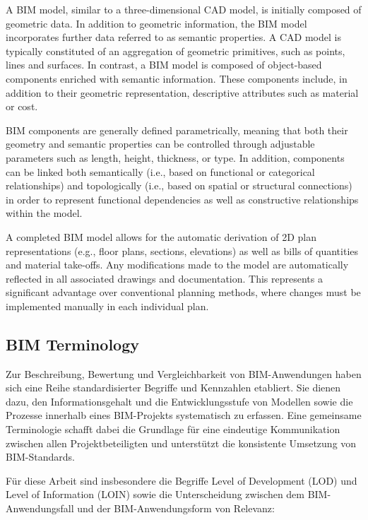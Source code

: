 \begin{English}
    A BIM model, similar to a three-dimensional CAD model, is initially composed of geometric data. In addition to geometric information, the BIM model incorporates further data referred to as semantic properties. A CAD model is typically constituted of an aggregation of geometric primitives, such as points, lines and surfaces. In contrast, a BIM model is composed of object-based components enriched with semantic information. These components include, in addition to their geometric representation, descriptive attributes such as material or cost.

    BIM components are generally defined parametrically, meaning that both their geometry and semantic properties can be controlled through adjustable parameters such as length, height, thickness, or type. In addition, components can be linked both semantically (i.e., based on functional or categorical relationships) and topologically (i.e., based on spatial or structural connections) in order to represent functional dependencies as well as constructive relationships within the model.

    A completed BIM model allows for the automatic derivation of 2D plan representations (e.g., floor plans, sections, elevations) as well as bills of quantities and material take-offs. Any modifications made to the model are automatically reflected in all associated drawings and documentation. This represents a significant advantage over conventional planning methods, where changes must be implemented manually in each individual plan. \cite{astourLehrbuchGrundlagenBIMArbeitsmethode2022}
\end{English}

\subsection{BIM Terminology}
\begin{German}
    Zur Beschreibung, Bewertung und Vergleichbarkeit von BIM-Anwendungen haben sich eine Reihe standardisierter Begriffe und Kennzahlen etabliert. Sie dienen dazu, den Informationsgehalt und die Entwicklungsstufe von Modellen sowie die Prozesse innerhalb eines BIM-Projekts systematisch zu erfassen. Eine gemeinsame Terminologie schafft dabei die Grundlage für eine eindeutige Kommunikation zwischen allen Projektbeteiligten und unterstützt die konsistente Umsetzung von BIM-Standards. 
    
    Für diese Arbeit sind insbesondere die Begriffe Level of Development (LOD) und Level of Information (LOIN) sowie die Unterscheidung zwischen dem BIM-Anwendungsfall und der BIM-Anwendungsform von Relevanz:
\end{German}

